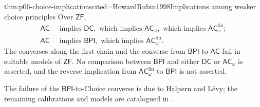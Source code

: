 \begin{hbtheorem}{thm:p06-choice-implications}{cited=HowardRubin1998}{Implications among weaker choice principles}
Over \(\mathsf{ZF}\),
\[
  \begin{aligned}
    \mathsf{AC}&\ \text{ implies }\mathsf{DC},\text{ which implies }
      \mathsf{AC}_{\omega},\text{ which implies }
      \mathsf{AC}_{\omega}^{\mathrm{fin}};\\
    \mathsf{AC}&\ \text{ implies }\mathsf{BPI},\text{ which implies }
      \mathsf{AC}_{\omega}^{\mathrm{fin}}.
  \end{aligned}
\]
The converses along the first chain and the converse from \(\mathsf{BPI}\) to
\(\mathsf{AC}\) fail in suitable models of \(\mathsf{ZF}\).  No comparison
between \(\mathsf{BPI}\) and either \(\mathsf{DC}\) or
\(\mathsf{AC}_{\omega}\) is asserted, and the reverse implication from
\(\mathsf{AC}_{\omega}^{\mathrm{fin}}\) to \(\mathsf{BPI}\) is not asserted.
\end{hbtheorem}
The failure of the \(\mathsf{BPI}\)-to-Choice converse is due to Halpern and
L\'evy; the remaining calibrations and models are catalogued in
\cite{Jech1973Choice,HowardRubin1998,HalpernLevy1971}.

